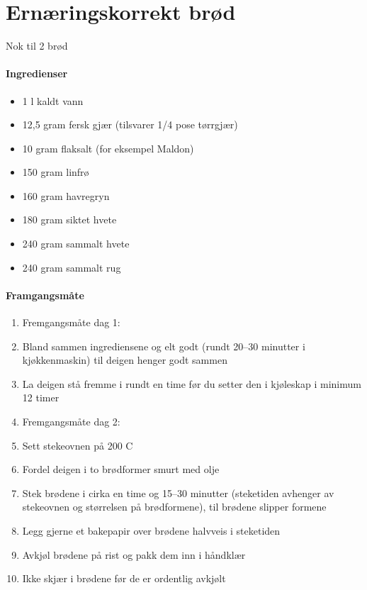 \section{Ernæringskorrekt brød}
Nok til 2 brød

\paragraph{Ingredienser}
\begin{itemize}[noitemsep]
	\item 1 l kaldt vann
	\item 12,5 gram fersk gjær (tilsvarer 1/4 pose tørrgjær)
	\item 10 gram flaksalt (for eksempel Maldon)
	\item 150 gram  linfrø
	\item 160 gram  havregryn
	\item 180 gram  siktet hvete
	\item 240 gram  sammalt hvete
	\item 240 gram  sammalt rug
\end{itemize}

\paragraph{Framgangsmåte}
\begin{enumerate}[noitemsep]
	\item Fremgangsmåte dag 1:
	\item Bland sammen ingrediensene og elt godt (rundt 20--30 minutter i kjøkkenmaskin) til deigen henger godt sammen
	\item La deigen stå fremme i rundt en time før du setter den i kjøleskap i minimum 12 timer
	\item Fremgangsmåte dag 2:
	\item Sett stekeovnen på 200 \degree C
	\item Fordel deigen i to brødformer smurt med olje
	\item Stek brødene i cirka en time og 15--30 minutter (steketiden avhenger av stekeovnen og størrelsen på brødformene), til brødene slipper formene
	\item Legg gjerne et bakepapir over brødene halvveis i steketiden
	\item Avkjøl brødene på rist og pakk dem inn i håndklær
	\item Ikke skjær i brødene før de er ordentlig avkjølt
\end{enumerate}

